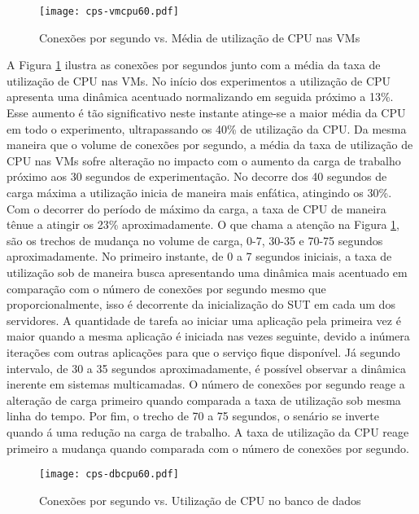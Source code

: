 \begin{figure}[htb]
	\centering
	\texttt{[image: cps-vmcpu60.pdf]}
	\caption{Conexões por segundo vs. Média de utilização de CPU nas VMs}
	\label{fig:cps-vmcpu60}
	\fdadospesquisa
\end{figure}

A Figura \ref{fig:cps-vmcpu60} ilustra as conexões por segundos junto com a média da taxa de utilização de CPU nas VMs. No início dos experimentos a utilização de CPU apresenta uma dinâmica acentuado normalizando em seguida próximo a 13\%. Esse aumento é tão significativo neste instante atinge-se a maior média da CPU em todo o experimento, ultrapassando os 40\% de utilização da CPU. Da mesma maneira que o volume de conexões por segundo, a média da taxa de utilização de CPU nas VMs sofre alteração no impacto com o aumento da carga de trabalho próximo aos 30 segundos de experimentação. No decorre dos 40 segundos de carga máxima a utilização inicia de maneira mais enfática, atingindo os 30\%. Com o decorrer do período de máximo da carga, a taxa de CPU de maneira tênue a atingir os 23\% aproximadamente. O que chama a atenção na Figura \ref{fig:cps-vmcpu60}, são os trechos de mudança no volume de carga, 0-7, 30-35 e 70-75 segundos aproximadamente. No primeiro instante, de 0 a 7 segundos iniciais, a taxa de utilização sob de maneira busca apresentando uma dinâmica mais acentuado em comparação com o número de conexões por segundo mesmo que proporcionalmente, isso é decorrente da inicialização do SUT em cada um dos servidores. A quantidade de tarefa ao iniciar uma aplicação pela primeira vez é maior quando a mesma aplicação é iniciada nas vezes seguinte, devido a inúmera iterações com outras aplicações para que o serviço fique disponível. Já segundo intervalo, de 30 a 35 segundos aproximadamente, é possível observar a dinâmica inerente em sistemas multicamadas. O número de conexões por segundo reage a alteração de carga primeiro quando comparada a taxa de utilização sob mesma linha do tempo. Por fim, o trecho de 70 a 75 segundos, o senário se inverte quando á uma redução na carga de trabalho. A taxa de utilização da CPU reage primeiro a mudança quando comparada com o número de conexões por segundo.

\begin{figure}[htb]
	\centering
	\texttt{[image: cps-dbcpu60.pdf]}
	\caption{Conexões por segundo vs. Utilização de CPU no banco de dados}
	\label{fig:cps-dbcpu60}
	\fdadospesquisa
\end{figure}

